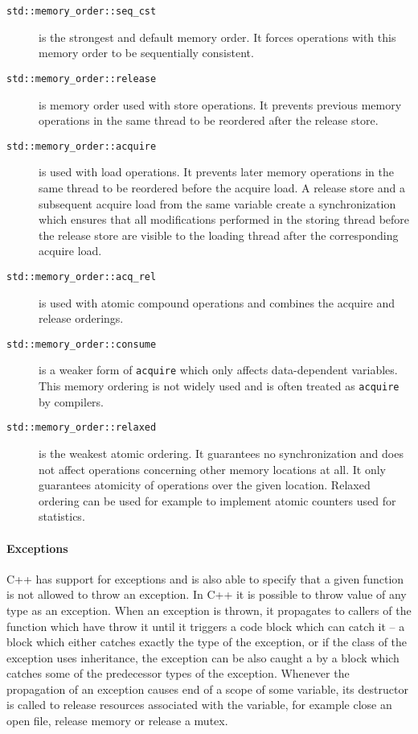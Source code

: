 \begin{description}
    \item[\texttt{std::memory\_order::seq\_cst}] is the strongest and default
        memory order.
        It forces operations with this memory order to be sequentially
        consistent.

    \item[\texttt{std::memory\_order::release}] is memory order used with store
        operations.
        It prevents previous memory operations in the same thread to be
        reordered after the release store.

    \item[\texttt{std::memory\_order::acquire}] is used with load operations.
        It prevents later memory operations in the same thread to be reordered
        before the acquire load.
        A release store and a subsequent acquire load from the same variable
        create a synchronization which ensures that all modifications
        performed in the storing thread before the release store are
        visible to the loading thread after the corresponding acquire load.

    \item[\texttt{std::memory\_order::acq\_rel}] is used with atomic
        compound operations and combines the acquire and release orderings.

    \item[\texttt{std::memory\_order::consume}] is a weaker form of
        \texttt{acquire} which only affects data-dependent variables.
        This memory ordering is not widely used and is often treated as
        \texttt{acquire} by compilers.

    \item[\texttt{std::memory\_order::relaxed}] is the weakest atomic
        ordering.
        It guarantees no synchronization and does not affect operations
        concerning other memory locations at all.
        It only guarantees atomicity of operations over the given location.
        Relaxed ordering can be used for example to implement atomic counters
        used for statistics.
\end{description}

\paragraph{Exceptions}

C++ has support for exceptions and is also able to specify that a given function
is not allowed to throw an exception.
In C++ it is possible to throw value of any type as an exception.
When an exception is thrown, it propagates to callers of the function which
have throw it until it triggers a  code block which can catch it --
a  block which either catches exactly the type of the exception, or
if the class of the exception uses inheritance, the exception can be also
caught a by a  block which catches some of the predecessor types of
the exception.
Whenever the propagation of an exception causes end of a scope of some variable, its destructor is called to release resources associated with the variable, for example close an open file, release memory or release a mutex.

